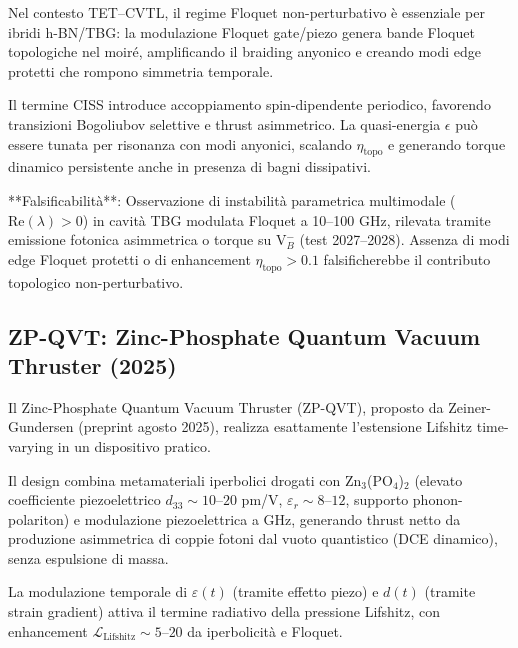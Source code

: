 \documentclass[11pt,a4paper]{article}
\theoremstyle{plain}
\theoremstyle{definition}
\begin{document}
Nel contesto TET–CVTL, il regime Floquet non-perturbativo è essenziale per ibridi h-BN/TBG: la modulazione Floquet gate/piezo genera bande Floquet topologiche nel moiré, amplificando il braiding anyonico e creando modi edge protetti che rompono simmetria temporale. 

\vspace{0.5cm}


Il termine CISS introduce accoppiamento spin-dipendente periodico, favorendo transizioni Bogoliubov selettive e thrust asimmetrico. La quasi-energia $\epsilon$ può essere tunata per risonanza con modi anyonici, scalando $\eta_{\mathrm{topo}}$ e generando torque dinamico persistente anche in presenza di bagni dissipativi.

\vspace{0.5cm}

**Falsificabilità**: Osservazione di instabilità parametrica multimodale ($\mathrm{Re}(\lambda) > 0$) in cavità TBG modulata Floquet a 10–100 GHz, rilevata tramite emissione fotonica asimmetrica o torque su V$_B^-$ (test 2027–2028). Assenza di modi edge Floquet protetti o di enhancement $\eta_{\mathrm{topo}} > 0.1$ falsificherebbe il contributo topologico non-perturbativo.

\vspace{0.5cm}

\subsection{ZP-QVT: Zinc-Phosphate Quantum Vacuum Thruster (2025)}

Il Zinc-Phosphate Quantum Vacuum Thruster (ZP-QVT), proposto da Zeiner-Gundersen (preprint agosto 2025), realizza esattamente l'estensione Lifshitz time-varying in un dispositivo pratico. 

\vspace{0.3cm}

Il design combina metamateriali iperbolici drogati con Zn$_3$(PO$_4$)$_2$ (elevato coefficiente piezoelettrico $d_{33} \sim 10$--$20$ pm/V, $\varepsilon_r \sim 8$--$12$, supporto phonon-polariton) e modulazione piezoelettrica a GHz, generando thrust netto da produzione asimmetrica di coppie fotoni dal vuoto quantistico (DCE dinamico), senza espulsione di massa.

\vspace{0.2cm}

La modulazione temporale di $\varepsilon(t)$ (tramite effetto piezo) e $d(t)$ (tramite strain gradient) attiva il termine radiativo della pressione Lifshitz, con enhancement $\mathcal{L}_{\mathrm{Lifshitz}} \sim 5$--$20$ da iperbolicità e Floquet.
\end{document}
